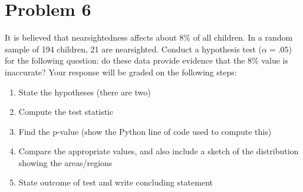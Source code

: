 \documentclass[11pt,twoside]{article}
\newcommand{\pts}[1]{\marginpar{ \small\hspace{0pt} \textit{[#1]} } }
\newcommand{\?}{\stackrel{?}{=}}
\begin{document}
 \section*{Problem 6       }
 It is believed that nearsightedness affects about 8\% of all children. In a random sample of 194 children, 21 are nearsighted. Conduct a hypothesis test ($\alpha=.05$) for the following question: do these data provide evidence that the 8\% value is inaccurate?
 Your response will be graded on the following steps:
 \begin{enumerate}[\bf (a)]
   \item State the hypotheses (there are two) \pts{2}
    \vspace{10ex}


   \item Compute the test statistic \pts{2}
       \vspace{25ex}

   \item Find the p-value (show the Python line of code used to compute this) \pts{2}
       \vspace{20ex}

   \item Compare the appropriate values, and also include a sketch of the distribution showing the areas/regions\pts{4}
       \vspace{25ex}


  \item State outcome of test and write concluding statement \pts{2}
 \end{enumerate}

   \eject
\end{document}
